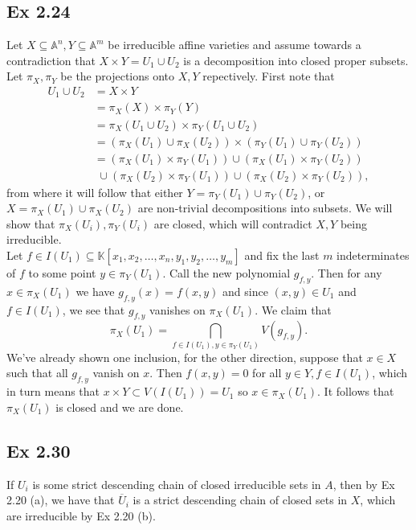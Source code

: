 \documentclass{article}
\theoremstyle{definition}
\newcommand{\K}{\mathbb{K}}
\newcommand{\A}{\mathbb{A}}
\newcommand{\An}{\A^n}
\newcommand{\Am}{\A^m}
\begin{document}
\subsection*{Ex 2.24} 

Let $X \subseteq \An, Y \subseteq \Am$ be irreducible affine varieties and
assume towards a contradiction that $X \times Y = U_1 \cup U_2$ is a
decomposition into closed proper subsets. Let $\pi_X, \pi_Y$ be the projections
onto $X, Y$ repectively. First note that
\begin{align*}
	U_1 \cup U_2
	&=
	X \times Y \\
	&=
	\pi_X(X) \times \pi_Y(Y) \\
	&=
	\pi_X(U_1 \cup U_2) \times \pi_Y(U_1 \cup U_2) \\
	&=
	(\pi_X(U_1) \cup \pi_X(U_2)) \times (\pi_Y(U_1) \cup \pi_Y(U_2)) \\
	&= 
	(\pi_X(U_1) \times \pi_Y(U_1))
	\cup 
	(\pi_X(U_1) \times \pi_Y(U_2)) \\
	&\,\, \cup 
	(\pi_X(U_2) \times \pi_Y(U_1))
	\cup 
	(\pi_X(U_2) \times \pi_Y(U_2)),
\end{align*}
from where it will follow that either $Y = \pi_Y(U_1) \cup \pi_Y(U_2)$, or $X =
\pi_X(U_1) \cup \pi_X(U_2)$ are non-trivial decompositions into subsets. We
will show that $\pi_X(U_i), \pi_Y(U_i)$ are closed, which will contradict $X,
Y$ being irreducible. \\

Let $f \in I(U_1) \subseteq \K[x_1, x_2, \ldots, x_n, y_1, y_2, \ldots, y_m]$
and fix the last $m$ indeterminates of $f$ to some point $y \in \pi_Y(U_1)$.
Call the new polynomial $g_{f, y}$. Then for any $x \in \pi_X(U_1)$ we have
$g_{f, y}(x) = f(x, y)$ and since $(x, y) \in U_1$ and $f \in I(U_1)$, we see
that $g_{f, y}$ vanishes on $\pi_X(U_1)$. We claim that
\[
	\pi_X(U_1) 
	= 
	\bigcap_{f \in I(U_1), y \in \pi_Y(U_1)}
	V
	\left( g_{f, y}\right).
\] 
We've already shown one inclusion, for the other direction, suppose that $x \in
X$ such that all $g_{f, y}$ vanish on $x$. Then $f(x, y) = 0$ for all $y \in Y,
f \in I(U_1)$, which in turn means that $x \times Y \subset V(I(U_1)) = U_1$ so
$x \in \pi_X(U_1)$. It follows that $\pi_X(U_1)$ is closed and we are done.

\subsection*{Ex 2.30} 
If $U_i$ is some strict descending chain of closed irreducible sets in $A$,
then by Ex 2.20 (a), we have that $\overline{U}_i$ is a strict descending chain
of closed sets in $X$, which are irreducible by Ex 2.20 (b).
\end{document}
